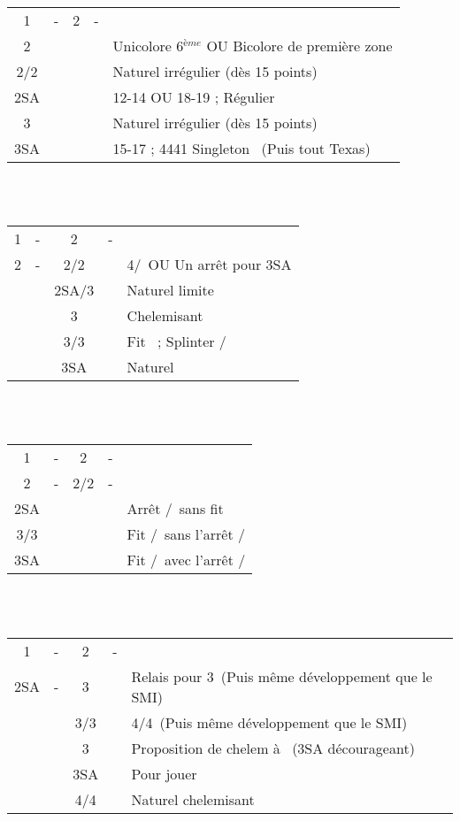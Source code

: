 \documentclass[a4paper, oneside, 11pt]{report}
\begin{document}
\newpage
		\begin{tabular}{cccc|l}
		1\carreau & - & 2\trefle & - &\\
		2\carreau &&&& Unicolore 6$^{ème}$ OU Bicolore de première zone\\
		2\coeur/2\pique &&&& Naturel irrégulier (dès 15 points) \\
		2SA &&&& 12-14 OU 18-19 ; Régulier\\
		3\trefle &&&& Naturel irrégulier (dès 15 points)\\
		3SA &&&& 15-17 ; 4441 Singleton \trefle\ (Puis tout Texas)\\
		\end{tabular}\\\\

		\begin{tabular}{cccc|l}
		1\carreau & - & 2\trefle & - &\\
		2\carreau & - & 2\coeur/2\pique && 4\coeur/\pique\ OU Un arrêt pour 3SA\\
		&& 2SA/3\trefle && Naturel limite\\
		&& 3\carreau && Chelemisant \carreau\\
		&& 3\coeur/3\pique && Fit \carreau\ ; Splinter \coeur/\pique\\
		&& 3SA && Naturel\\
		\end{tabular}\\\\

		\begin{tabular}{cccc|l}
		1\carreau & - & 2\trefle & - &\\
		2\carreau & - & 2\coeur/2\pique & - &\\
		2SA &&&& Arrêt \pique/\coeur\ sans fit\\
		3\coeur/3\pique &&&& Fit \coeur/\pique\ sans l'arrêt \pique/\coeur\\
		3SA &&&& Fit \coeur/\pique\ avec l'arrêt \pique/\coeur\\
		\end{tabular}\\\\

		\begin{tabular}{cccc|l}
		1\carreau & - & 2\trefle & - &\\
		2SA & - & 3\trefle && Relais pour 3\carreau\ (Puis même développement que le SMI)\\
		&& 3\carreau/3\coeur && 4\coeur/4\pique\ (Puis même développement que le SMI)\\
		&& 3\pique && Proposition de chelem à \trefle\ (3SA décourageant)\\
		&& 3SA && Pour jouer\\
		&& 4\trefle/4\carreau && Naturel chelemisant\\
		\end{tabular}\\\\
\end{document}
